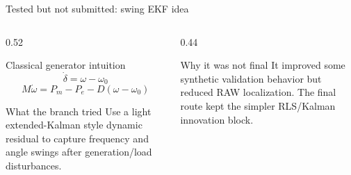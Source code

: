 \documentclass[10pt,aspectratio=169]{beamer}
\begin{document}
\begin{frame}{Tested but not submitted: swing EKF idea}
\small
\begin{columns}[T,totalwidth=\textwidth]
\begin{column}{0.52\textwidth}
\begin{block}{Classical generator intuition}
\[
\dot{\delta}=\omega-\omega_0
\]
\[
M\dot{\omega}=P_m-P_e-D(\omega-\omega_0)
\]
\end{block}
\begin{exampleblock}{What the branch tried}
Use a light extended-Kalman style dynamic residual to capture frequency and angle swings after generation/load disturbances.
\end{exampleblock}
\end{column}
\begin{column}{0.44\textwidth}
\centering
{}
\vspace{2mm}
\begin{alertblock}{Why it was not final}
It improved some synthetic validation behavior but reduced RAW localization. The final route kept the simpler RLS/Kalman innovation block.
\end{alertblock}
\end{column}
\end{columns}
\end{frame}
\end{document}
